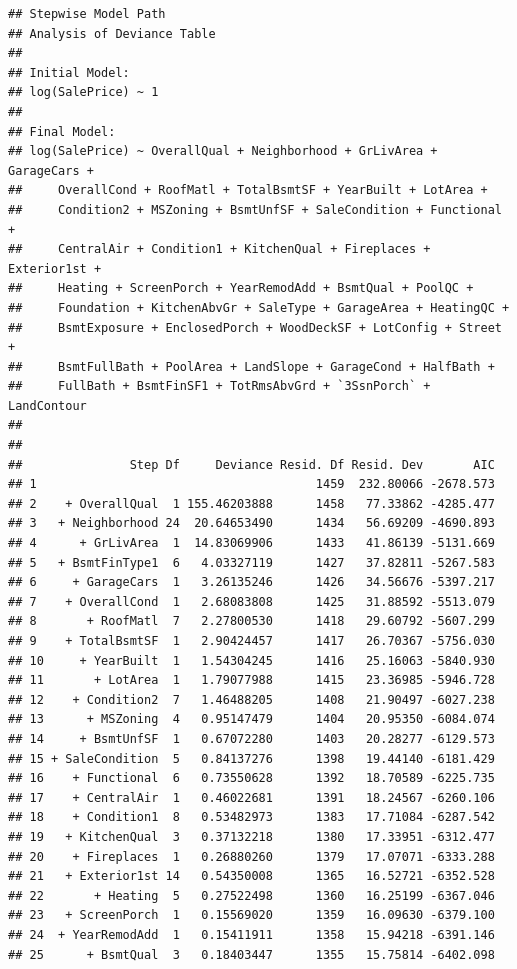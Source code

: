 \documentclass[american,]{article}
\theoremstyle{definition}
\theoremstyle{definition}
\theoremstyle{definition}
\theoremstyle{remark}
\begin{document}
\begin{verbatim}
## Stepwise Model Path 
## Analysis of Deviance Table
## 
## Initial Model:
## log(SalePrice) ~ 1
## 
## Final Model:
## log(SalePrice) ~ OverallQual + Neighborhood + GrLivArea + GarageCars + 
##     OverallCond + RoofMatl + TotalBsmtSF + YearBuilt + LotArea + 
##     Condition2 + MSZoning + BsmtUnfSF + SaleCondition + Functional + 
##     CentralAir + Condition1 + KitchenQual + Fireplaces + Exterior1st + 
##     Heating + ScreenPorch + YearRemodAdd + BsmtQual + PoolQC + 
##     Foundation + KitchenAbvGr + SaleType + GarageArea + HeatingQC + 
##     BsmtExposure + EnclosedPorch + WoodDeckSF + LotConfig + Street + 
##     BsmtFullBath + PoolArea + LandSlope + GarageCond + HalfBath + 
##     FullBath + BsmtFinSF1 + TotRmsAbvGrd + `3SsnPorch` + LandContour
## 
## 
##               Step Df     Deviance Resid. Df Resid. Dev       AIC
## 1                                       1459  232.80066 -2678.573
## 2    + OverallQual  1 155.46203888      1458   77.33862 -4285.477
## 3   + Neighborhood 24  20.64653490      1434   56.69209 -4690.893
## 4      + GrLivArea  1  14.83069906      1433   41.86139 -5131.669
## 5   + BsmtFinType1  6   4.03327119      1427   37.82811 -5267.583
## 6     + GarageCars  1   3.26135246      1426   34.56676 -5397.217
## 7    + OverallCond  1   2.68083808      1425   31.88592 -5513.079
## 8       + RoofMatl  7   2.27800530      1418   29.60792 -5607.299
## 9    + TotalBsmtSF  1   2.90424457      1417   26.70367 -5756.030
## 10     + YearBuilt  1   1.54304245      1416   25.16063 -5840.930
## 11       + LotArea  1   1.79077988      1415   23.36985 -5946.728
## 12    + Condition2  7   1.46488205      1408   21.90497 -6027.238
## 13      + MSZoning  4   0.95147479      1404   20.95350 -6084.074
## 14     + BsmtUnfSF  1   0.67072280      1403   20.28277 -6129.573
## 15 + SaleCondition  5   0.84137276      1398   19.44140 -6181.429
## 16    + Functional  6   0.73550628      1392   18.70589 -6225.735
## 17    + CentralAir  1   0.46022681      1391   18.24567 -6260.106
## 18    + Condition1  8   0.53482973      1383   17.71084 -6287.542
## 19   + KitchenQual  3   0.37132218      1380   17.33951 -6312.477
## 20    + Fireplaces  1   0.26880260      1379   17.07071 -6333.288
## 21   + Exterior1st 14   0.54350008      1365   16.52721 -6352.528
## 22       + Heating  5   0.27522498      1360   16.25199 -6367.046
## 23   + ScreenPorch  1   0.15569020      1359   16.09630 -6379.100
## 24  + YearRemodAdd  1   0.15411911      1358   15.94218 -6391.146
## 25      + BsmtQual  3   0.18403447      1355   15.75814 -6402.098

\end{verbatim}
\end{document}
